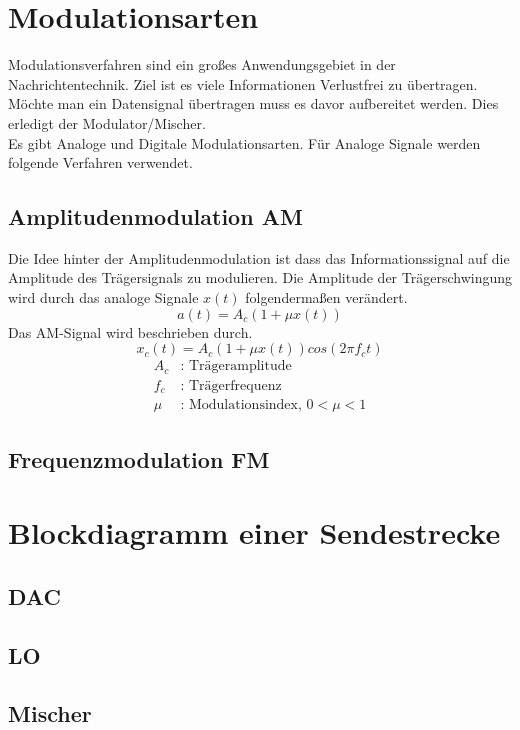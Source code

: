 \section{Modulationsarten}
Modulationsverfahren sind ein großes Anwendungsgebiet in der Nachrichtentechnik.
Ziel ist es viele Informationen Verlustfrei zu übertragen.
Möchte man ein Datensignal übertragen muss es davor
aufbereitet werden. Dies erledigt der Modulator/Mischer.
\\
Es gibt Analoge und Digitale Modulationsarten.
Für Analoge Signale werden folgende Verfahren verwendet.


\subsection{Amplitudenmodulation AM}
Die Idee hinter der Amplitudenmodulation ist dass das Informationssignal
auf die Amplitude des Trägersignals zu modulieren.
Die Amplitude der Trägerschwingung wird durch das analoge Signale
$x(t)$ folgendermaßen verändert.
\begin{equation}
    a(t)=A_c(1+\mu x(t))
\end{equation}
Das AM-Signal wird beschrieben durch.
\begin{equation}
    x_c(t)=A_c(1+\mu x(t))cos(2\pi f_c t)
\end{equation}
\begin{align}
    A_c &\text{: Trägeramplitude} \\
    f_c &\text{: Trägerfrequenz} \\
    \mu &\text{: Modulationsindex, } 0 < \mu < 1
\end{align}


\subsection{Frequenzmodulation FM}

\section{Blockdiagramm einer Sendestrecke}
\subsection{DAC}
\subsection{LO}
\subsection{Mischer} 
